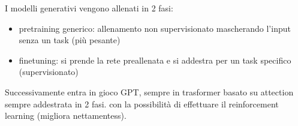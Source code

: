 I modelli generativi vengono allenati in 2 fasi:
\begin{itemize}
    \item pretraining generico: allenamento non supervisionato mascherando l'input 
    senza un task (più pesante)
    \item finetuning: si prende la rete preallenata e si addestra per un task
    specifico (supervisionato)
\end{itemize}

Successivamente entra in gioco GPT, sempre in trasformer basato su attection sempre
addestrata in 2 fasi. con la possibilità di effettuare il reinforcement learning 
(migliora nettamentess).